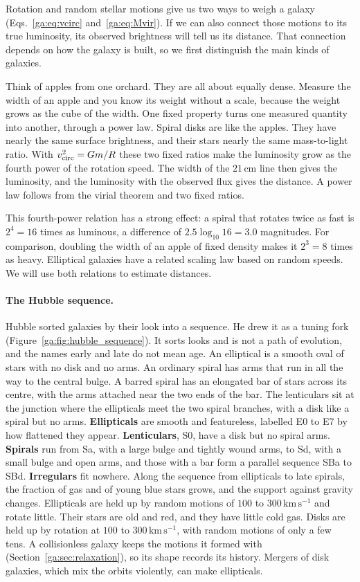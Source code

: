 Rotation and random stellar motions give us two ways to weigh a galaxy (Eqs.~\eqref{ga:eq:vcirc} and~\eqref{ga:eq:Mvir}). If we can also connect those motions to its true luminosity, its observed brightness will tell us its distance. That connection depends on how the galaxy is built, so we first distinguish the main kinds of galaxies.

Think of apples from one orchard. They are all about equally dense. Measure the width of an apple and you know its weight without a scale, because the weight grows as the cube of the width. One fixed property turns one measured quantity into another, through a power law. Spiral disks are like the apples. They have nearly the same surface brightness, and their stars nearly the same mass-to-light ratio. With $v_{\rm circ}^2=Gm/R$ these two fixed ratios make the luminosity grow as the fourth power of the rotation speed. The width of the $21\,\mathrm{cm}$ line then gives the luminosity, and the luminosity with the observed flux gives the distance. A power law follows from the virial theorem and two fixed ratios.

This fourth-power relation has a strong effect: a spiral that rotates twice as fast is $2^4=16$ times as luminous, a difference of $2.5\log_{10}16=3.0$ magnitudes. For comparison, doubling the width of an apple of fixed density makes it $2^3=8$ times as heavy. Elliptical galaxies have a related scaling law based on random speeds. We will use both relations to estimate distances.

\paragraph{The Hubble sequence.} Hubble sorted galaxies by their look into a sequence. He drew it as a tuning fork (Figure~\ref{ga:fig:hubble_sequence}). It sorts looks and is not a path of evolution, and the names early and late do not mean age. An elliptical is a smooth oval of stars with no disk and no arms. An ordinary spiral has arms that run in all the way to the central bulge. A barred spiral has an elongated bar of stars across its centre, with the arms attached near the two ends of the bar. The lenticulars sit at the junction where the ellipticals meet the two spiral branches, with a disk like a spiral but no arms. \textbf{Ellipticals} are smooth and featureless, labelled E0 to E7 by how flattened they appear. \textbf{Lenticulars}, S0, have a disk but no spiral arms. \textbf{Spirals} run from Sa, with a large bulge and tightly wound arms, to Sd, with a small bulge and open arms, and those with a bar form a parallel sequence SBa to SBd. \textbf{Irregulars} fit nowhere. Along the sequence from ellipticals to late spirals, the fraction of gas and of young blue stars grows, and the support against gravity changes. Ellipticals are held up by random motions of $100$ to $300\,\mathrm{km\,s^{-1}}$ and rotate little. Their stars are old and red, and they have little cold gas. Disks are held up by rotation at $100$ to $300\,\mathrm{km\,s^{-1}}$, with random motions of only a few tens. A collisionless galaxy keeps the motions it formed with (Section~\ref{ga:sec:relaxation}), so its shape records its history. Mergers of disk galaxies, which mix the orbits violently, can make ellipticals.

